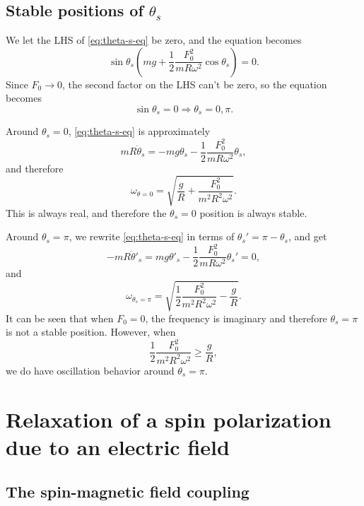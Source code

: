 \documentclass[hyperref, a4paper]{article}
\begin{document}
\subsection{Stable positions of $\theta_s$}

We let the LHS of \eqref{eq:theta-s-eq} be zero, 
and the equation becomes 
\[
    \sin \theta_s \left(
        mg + \frac{1}{2} \frac{F_0^2}{m R \omega^2} \cos \theta_s
    \right) = 0.
\]
Since $F_0 \to 0$, the second factor on the LHS can't be zero, 
so the equation becomes 
\begin{equation}
    \sin \theta_s = 0 \Rightarrow \theta_s = 0, \pi.
\end{equation}

Around $\theta_s = 0$, \eqref{eq:theta-s-eq} is approximately 
\[
    m R \ddot{\theta}_s = - mg \theta_s - \frac{1}{2} \frac{F_0^2}{m R \omega^2} \theta_s, 
\]
and therefore 
\begin{equation}
    \omega_{\theta = 0} = \sqrt{
        \frac{g}{R} + \frac{F_0^2}{m^2 R^2 \omega^2}
    }.
\end{equation}
This is always real, and therefore the $\theta_s = 0$ position is always stable.

Around $\theta_s = \pi$, we rewrite \eqref{eq:theta-s-eq} in terms of $\theta_s' = \pi - \theta_s$, 
and get 
\[
    - m R \ddot{\theta}'_s = mg \theta'_s - \frac{1}{2} \frac{F_0^2}{m R \omega^2} \theta_s' = 0,
\]
and 
\begin{equation}
    \omega_{\theta_s = \pi} = \sqrt{\frac{1}{2} \frac{F_0^2}{m^2 R^2 \omega^2} - \frac{g}{R}}.
\end{equation}
It can be seen that when $F_0 = 0$, 
the frequency is imaginary and therefore $\theta_s = \pi$ 
is not a stable position. 
However, when 
\begin{equation}
    \frac{1}{2} \frac{F_0^2}{m^2 R^2 \omega^2} \geq \frac{g}{R},
\end{equation}
we do have oscillation behavior around $\theta_s = \pi$.

\section{Relaxation of a spin polarization due to an electric field}

\subsection{The spin-magnetic field coupling}
\end{document}
